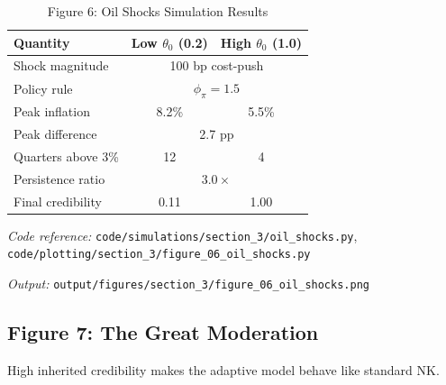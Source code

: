 \documentclass[11pt]{article}
\begin{document}
\begin{table}[htbp]
\centering
\caption{Figure 6: Oil Shocks Simulation Results}
\label{tab:oil_shocks}
\begin{threeparttable}
\begin{tabular}{lcc}
\toprule
Quantity & Low $\theta_0$ (0.2) & High $\theta_0$ (1.0) \\
\midrule
Shock magnitude & \multicolumn{2}{c}{100 bp cost-push} \\
Policy rule & \multicolumn{2}{c}{$\phi_\pi = 1.5$} \\
\midrule
Peak inflation & 8.2\% & 5.5\% \\
Peak difference & \multicolumn{2}{c}{2.7 pp} \\
Quarters above 3\% & 12 & 4 \\
Persistence ratio & \multicolumn{2}{c}{$3.0\times$} \\
Final credibility & 0.11 & 1.00 \\
\bottomrule
\end{tabular}
\begin{tablenotes}
\small
\item \textit{Code reference:} \texttt{code/simulations/section\_3/oil\_shocks.py}, \texttt{code/plotting/section\_3/figure\_06\_oil\_shocks.py}
\item \textit{Output:} \texttt{output/figures/section\_3/figure\_06\_oil\_shocks.png}
\end{tablenotes}
\end{threeparttable}
\end{table}

\subsection{Figure 7: The Great Moderation}

High inherited credibility makes the adaptive model behave like standard NK.
\end{document}
